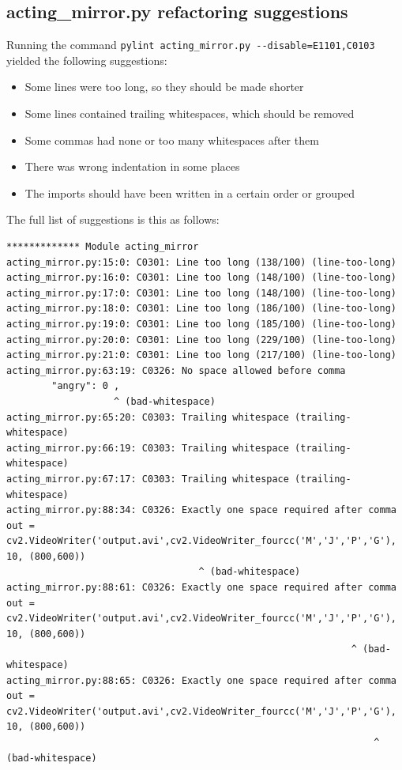 \documentclass[runningheads,a4paper,11pt]{report}
\begin{document}
\begin{appendices}
\subsection{acting\_mirror.py refactoring suggestions}
Running the command \verb|pylint acting_mirror.py --disable=E1101,C0103| yielded the following suggestions:
\begin{itemize}
	\item Some lines were too long, so they should be made shorter
	\item Some lines contained trailing whitespaces, which should be removed
	\item Some commas had none or too many whitespaces after them
	\item There was wrong indentation in some places
	\item The imports should have been written in a certain order or grouped
\end{itemize}
The full list of suggestions is this as follows:
\begin{lstlisting}
************* Module acting_mirror
acting_mirror.py:15:0: C0301: Line too long (138/100) (line-too-long)
acting_mirror.py:16:0: C0301: Line too long (148/100) (line-too-long)
acting_mirror.py:17:0: C0301: Line too long (148/100) (line-too-long)
acting_mirror.py:18:0: C0301: Line too long (186/100) (line-too-long)
acting_mirror.py:19:0: C0301: Line too long (185/100) (line-too-long)
acting_mirror.py:20:0: C0301: Line too long (229/100) (line-too-long)
acting_mirror.py:21:0: C0301: Line too long (217/100) (line-too-long)
acting_mirror.py:63:19: C0326: No space allowed before comma
        "angry": 0 ,
                   ^ (bad-whitespace)
acting_mirror.py:65:20: C0303: Trailing whitespace (trailing-whitespace)
acting_mirror.py:66:19: C0303: Trailing whitespace (trailing-whitespace)
acting_mirror.py:67:17: C0303: Trailing whitespace (trailing-whitespace)
acting_mirror.py:88:34: C0326: Exactly one space required after comma
out = cv2.VideoWriter('output.avi',cv2.VideoWriter_fourcc('M','J','P','G'), 10, (800,600))
                                  ^ (bad-whitespace)
acting_mirror.py:88:61: C0326: Exactly one space required after comma
out = cv2.VideoWriter('output.avi',cv2.VideoWriter_fourcc('M','J','P','G'), 10, (800,600))
                                                             ^ (bad-whitespace)
acting_mirror.py:88:65: C0326: Exactly one space required after comma
out = cv2.VideoWriter('output.avi',cv2.VideoWriter_fourcc('M','J','P','G'), 10, (800,600))
                                                                 ^ (bad-whitespace)

\end{lstlisting}
\end{appendices}
\end{document}
